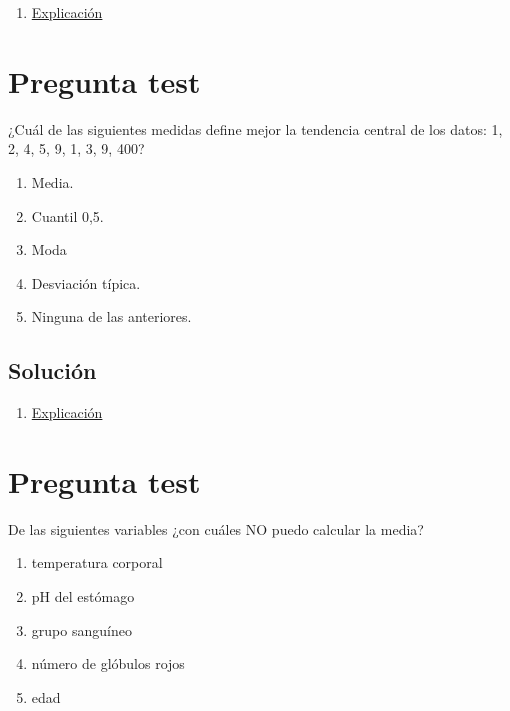 \documentclass[
]{book}
\providecommand{\tightlist}{%
  \setlength{\itemsep}{0pt}\setlength{\parskip}{0pt}}
\begin{document}
\begin{enumerate}
\def\labelenumi{\alph{enumi})}
\tightlist
\item
  \href{https://1fjmanzano.github.io/bioestadistica/medidas-de-forma.html}{Explicación}
\end{enumerate}

\hypertarget{pregunta-test-51}{%
\section{Pregunta test}\label{pregunta-test-51}}

¿Cuál de las siguientes medidas define mejor la tendencia central de los datos: 1, 2, 4, 5, 9, 1, 3, 9, 400?

\begin{enumerate}
\def\labelenumi{\alph{enumi})}
\tightlist
\item
  Media.
\item
  Cuantil 0,5.
\item
  Moda
\item
  Desviación típica.
\item
  Ninguna de las anteriores.
\end{enumerate}

\hypertarget{soluciuxf3n-53}{%
\subsection{Solución}\label{soluciuxf3n-53}}

\begin{enumerate}
\def\labelenumi{\alph{enumi})}
\setcounter{enumi}{1}
\tightlist
\item
  \href{https://1fjmanzano.github.io/bioestadistica/medidas-de-posicio\%CC\%81n-dispersio\%CC\%81n-y-forma.html\#medidas-de-posicio\%CC\%81n-no-centrales}{Explicación}
\end{enumerate}

\hypertarget{pregunta-test-52}{%
\section{Pregunta test}\label{pregunta-test-52}}

De las siguientes variables ¿con cuáles NO puedo calcular la media?

\begin{enumerate}
\def\labelenumi{\alph{enumi})}
\tightlist
\item
  temperatura corporal
\item
  pH del estómago
\item
  grupo sanguíneo
\item
  número de glóbulos rojos
\item
  edad
\end{enumerate}
\end{document}
